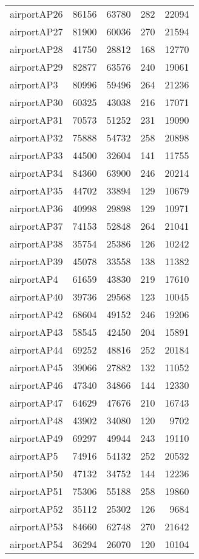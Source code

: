 \begin{tabular}{lrrrr}
airportAP26 & 86156 & 63780 & 282 & 22094 \\
airportAP27 & 81900 & 60036 & 270 & 21594 \\
airportAP28 & 41750 & 28812 & 168 & 12770 \\
airportAP29 & 82877 & 63576 & 240 & 19061 \\
airportAP3 & 80996 & 59496 & 264 & 21236 \\
airportAP30 & 60325 & 43038 & 216 & 17071 \\
airportAP31 & 70573 & 51252 & 231 & 19090 \\
airportAP32 & 75888 & 54732 & 258 & 20898 \\
airportAP33 & 44500 & 32604 & 141 & 11755 \\
airportAP34 & 84360 & 63900 & 246 & 20214 \\
airportAP35 & 44702 & 33894 & 129 & 10679 \\
airportAP36 & 40998 & 29898 & 129 & 10971 \\
airportAP37 & 74153 & 52848 & 264 & 21041 \\
airportAP38 & 35754 & 25386 & 126 & 10242 \\
airportAP39 & 45078 & 33558 & 138 & 11382 \\
airportAP4 & 61659 & 43830 & 219 & 17610 \\
airportAP40 & 39736 & 29568 & 123 & 10045 \\
airportAP42 & 68604 & 49152 & 246 & 19206 \\
airportAP43 & 58545 & 42450 & 204 & 15891 \\
airportAP44 & 69252 & 48816 & 252 & 20184 \\
airportAP45 & 39066 & 27882 & 132 & 11052 \\
airportAP46 & 47340 & 34866 & 144 & 12330 \\
airportAP47 & 64629 & 47676 & 210 & 16743 \\
airportAP48 & 43902 & 34080 & 120 & 9702 \\
airportAP49 & 69297 & 49944 & 243 & 19110 \\
airportAP5 & 74916 & 54132 & 252 & 20532 \\
airportAP50 & 47132 & 34752 & 144 & 12236 \\
airportAP51 & 75306 & 55188 & 258 & 19860 \\
airportAP52 & 35112 & 25302 & 126 & 9684 \\
airportAP53 & 84660 & 62748 & 270 & 21642 \\
airportAP54 & 36294 & 26070 & 120 & 10104 \\

\end{tabular}
